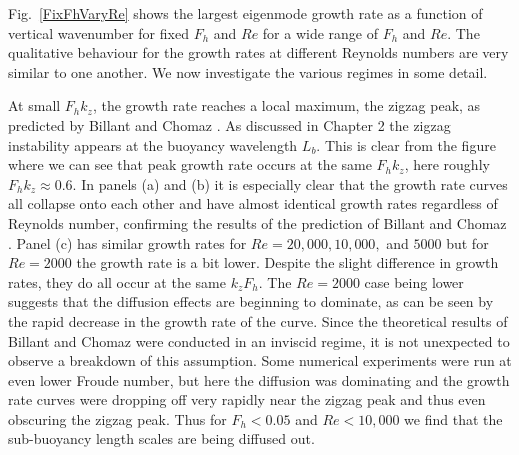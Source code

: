Fig.~\ref{FixFhVaryRe} shows the largest eigenmode growth rate as a function of vertical wavenumber for fixed $F_{h}$ and $Re$ for a wide range of $F_{h}$ and $Re$. The qualitative behaviour for the growth rates at different Reynolds numbers are very similar to one another. We now investigate the various regimes in some detail.

At small $F_{h}k_{z}$, the growth rate reaches a local maximum, the zigzag peak, as predicted by Billant and Chomaz \cite{bc2000a,bc2000b,bc2000c}.  As discussed in Chapter 2 the zigzag instability appears at the buoyancy wavelength $L_{b}$. This is clear from the figure where we can see that peak growth rate occurs at the same $F_{h}k_{z}$, here roughly $F_{h}k_{z}\approx 0.6$. In panels (a) and (b) it is especially clear that the growth rate curves all collapse onto each other and have almost identical growth rates regardless of Reynolds number, confirming the results of the prediction of Billant and Chomaz \cite{bc2000b,bc2000c}. Panel (c) has similar growth rates for $Re=20{,}000,10{,}000,$ and $5000$ but for $Re=2000$ the growth rate is a bit lower. Despite the slight difference in growth rates, they do all occur at the same $k_{z}F_{h}$. The $Re=2000$ case being lower suggests that the diffusion effects are beginning to dominate, as can be seen by the rapid decrease in the growth rate of the curve. Since the theoretical results of Billant and Chomaz \cite{bc2000b} were conducted in an inviscid regime, it is not unexpected to observe a breakdown of this assumption. Some numerical experiments were run at even lower Froude number, but here the diffusion was dominating and the growth rate curves were dropping off very rapidly near the zigzag peak and thus even obscuring the zigzag peak. Thus for $F_{h}<0.05$ and $Re<10{,}000$ we find that the sub-buoyancy length scales are being diffused out. 


